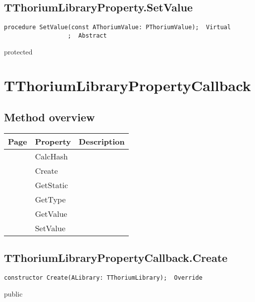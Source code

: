 \subsection{TThoriumLibraryProperty.SetValue}
\label{thoriumcore:thorium:tthoriumlibraryproperty:setvalue}
\begin{FPCList}
\Synopsis
\Declaration 

\begin{verbatim}
procedure SetValue(const AThoriumValue: PThoriumValue);  Virtual
                  ;  Abstract
\end{verbatim}
\Visibility
protected
\Description
\Errors
\end{FPCList}
\section{TThoriumLibraryPropertyCallback}
\label{thoriumcore:thorium:tthoriumlibrarypropertycallback}
\subsection{Method overview}
\label{thoriumcore:thorium:tthoriumlibrarypropertycallback:methods}
\begin{tabularx}{\textwidth}{llX}
Page & Property & Description  \\ \hline
\pageref{thoriumcore:thorium:tthoriumlibrarypropertycallback:calchash} & CalcHash  &  \\
\pageref{thoriumcore:thorium:tthoriumlibrarypropertycallback:create} & Create  &  \\
\pageref{thoriumcore:thorium:tthoriumlibrarypropertycallback:getstatic} & GetStatic  &  \\
\pageref{thoriumcore:thorium:tthoriumlibrarypropertycallback:gettype} & GetType  &  \\
\pageref{thoriumcore:thorium:tthoriumlibrarypropertycallback:getvalue} & GetValue  &  \\
\pageref{thoriumcore:thorium:tthoriumlibrarypropertycallback:setvalue} & SetValue  &  \\
\hline
\end{tabularx}
\subsection{TThoriumLibraryPropertyCallback.Create}
\label{thoriumcore:thorium:tthoriumlibrarypropertycallback:create}
\begin{FPCList}
\Synopsis
\Declaration 

\begin{verbatim}
constructor Create(ALibrary: TThoriumLibrary);  Override
\end{verbatim}
\Visibility
public
\Description
\Errors
\end{FPCList}
